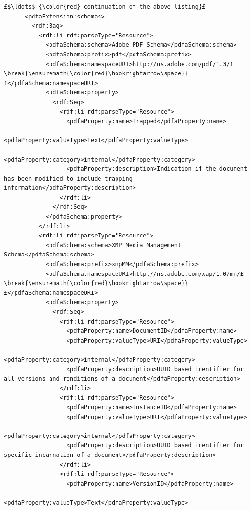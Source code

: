 \documentclass[12pt, twoside]{article}
\begin{document}
\begin{lstlisting}[style=myXML,
caption={Second part of the XML metadata embedded in a PDF file (some reformatting has been done to fit the text in the borders)}, label={lst:pdfinfoOutputPart2}]
£$\ldots$ {\color{red} continuation of the above listing}£ 
      <pdfaExtension:schemas>
        <rdf:Bag>
          <rdf:li rdf:parseType="Resource">
            <pdfaSchema:schema>Adobe PDF Schema</pdfaSchema:schema>
            <pdfaSchema:prefix>pdf</pdfaSchema:prefix>
            <pdfaSchema:namespaceURI>http://ns.adobe.com/pdf/1.3/£\break{\ensuremath{\color{red}\hookrightarrow\space}}£</pdfaSchema:namespaceURI>
            <pdfaSchema:property>
              <rdf:Seq>
                <rdf:li rdf:parseType="Resource">
                  <pdfaProperty:name>Trapped</pdfaProperty:name>
                  <pdfaProperty:valueType>Text</pdfaProperty:valueType>
                  <pdfaProperty:category>internal</pdfaProperty:category>
                  <pdfaProperty:description>Indication if the document has been modified to include trapping information</pdfaProperty:description>
                </rdf:li>
              </rdf:Seq>
            </pdfaSchema:property>
          </rdf:li>
          <rdf:li rdf:parseType="Resource">
            <pdfaSchema:schema>XMP Media Management Schema</pdfaSchema:schema>
            <pdfaSchema:prefix>xmpMM</pdfaSchema:prefix>
            <pdfaSchema:namespaceURI>http://ns.adobe.com/xap/1.0/mm/£\break{\ensuremath{\color{red}\hookrightarrow\space}}£</pdfaSchema:namespaceURI>
            <pdfaSchema:property>
              <rdf:Seq>
                <rdf:li rdf:parseType="Resource">
                  <pdfaProperty:name>DocumentID</pdfaProperty:name>
                  <pdfaProperty:valueType>URI</pdfaProperty:valueType>
                  <pdfaProperty:category>internal</pdfaProperty:category>
                  <pdfaProperty:description>UUID based identifier for all versions and renditions of a document</pdfaProperty:description>
                </rdf:li>
                <rdf:li rdf:parseType="Resource">
                  <pdfaProperty:name>InstanceID</pdfaProperty:name>
                  <pdfaProperty:valueType>URI</pdfaProperty:valueType>
                  <pdfaProperty:category>internal</pdfaProperty:category>
                  <pdfaProperty:description>UUID based identifier for specific incarnation of a document</pdfaProperty:description>
                </rdf:li>
                <rdf:li rdf:parseType="Resource">
                  <pdfaProperty:name>VersionID</pdfaProperty:name>
                  <pdfaProperty:valueType>Text</pdfaProperty:valueType>

\end{lstlisting}
\end{document}

